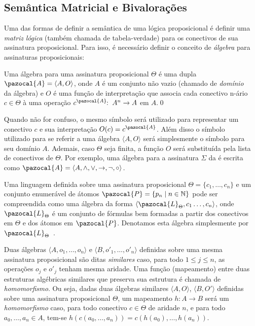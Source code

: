     \subsection{Semântica Matricial e Bivalorações}
        Uma das formas de definir a semântica de uma lógica proposicional é definir uma \textit{matriz lógica} (também chamada de tabela-verdade) para os conectivos de sua assinatura proposicional. Para isso, é necessário definir o conceito de \textit{álgebra} para assinaturas proposicionais:

        \begin{definicao}\label{def:algebra}
            Uma álgebra para uma assinatura proposicional $\Theta$ é uma dupla $\pazocal{A} = \langle A, O \rangle$, onde $A$ é um conjunto não vazio (chamado de \textit{domínio} da álgebra) e $O$ é uma função de interpretação que associa cada conectivo n-ário $c \in \Theta$ à uma operação $c^{\pazocal{A}}\!\! : \; A^{n} \to A$ em $A$.\qed{}
        \end{definicao}

        Quando não for confuso, o mesmo símbolo será utilizado para representar um conectivo $c$ e sua interpretação $O(c) = c^{\pazocal{A}}$. Além disso o símbolo utilizado para se referir a uma álgebra $\langle A, O \rangle$ será simplesmente o símbolo para seu domínio $A$. Ademais, caso $\Theta$ seja finita, a função $O$ será substituída pela lista de conectivos de $\Theta$. Por exemplo, uma álgebra para a assinatura $\Sigma$ da \lfium{} é escrita como $\pazocal{A} = \langle A,\land, \lor, \to, \neg, \circ \rangle$.

        \begin{observacao}
            Uma linguagem definida sobre uma assinatura proposicional $\Theta = \{c_{1}, \ldots, c_{n}\}$ e um conjunto enumerável de átomos $\pazocal{P} = \{p_{n} \; | \; n \in \mathbb{N} \}$ pode ser compreendida como uma álgebra da forma $\langle \pazocal{L}_{\Theta}, c_{1}\ldots, c_{n} \rangle$, onde $\pazocal{L}_{\Theta}$ é um conjunto de fórmulas bem formadas a partir dos conectivos em $\Theta$ e dos átomos em $\pazocal{P}$. Denotamos esta álgebra simplesmente por $\pazocal{L}_{\Theta}$~\cite{Sikorski1966-SIKAOF,Wojcicki1984-WJCLOP}.
        \end{observacao}

        Duas álgebras $\langle A, o_1, \ldots, o_n \rangle$ e $\langle B, o'_1, \ldots, o'_n \rangle$ definidas sobre uma mesma assinatura proposicional são ditas \textit{similares} caso, para todo $1 \leq j \leq n$, as operações $o_j$ e $o'_j$ tenham mesma aridade. Uma função (mapeamento) entre duas estruturas algébricas similares que preserva sua estrutura é chamada de \textit{homomorfismo}. Ou seja, dadas duas álgebras similares $\langle A, O \rangle$, $\langle B, O' \rangle$ definidas sobre uma assinatura proposicional $\Theta$, um mapeamento $h : A \to B$ será um \textit{homomorfismo} caso, para todo conectivo $c \in \Theta$ de aridade $n$, e para todo $a_{0},\ldots,a_{n} \in A$, tem-se $h(c(a_{0},\ldots, a_{n})) = c(h(a_{0}),\ldots, h(a_{n}))$.

